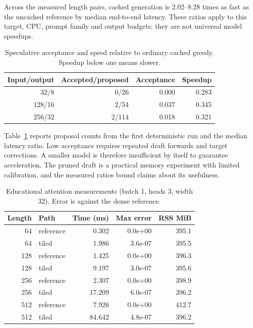 Across the measured length pairs, cached generation is 2.02--8.28 times as fast as the uncached reference by median end-to-end latency. These ratios apply to this target, CPU, prompt family and output budgets; they are not universal model speedups.

\begin{table}[t]\centering\scriptsize\caption{Speculative acceptance and speed relative to ordinary cached greedy. Speedup below one means slower.}\label{tab:spec}\begin{tabular}{rrrr}\toprule Input/output & Accepted/proposed & Acceptance & Speedup\\\midrule

32/8 & 0/26 & 0.000 & 0.283\\

128/16 & 2/54 & 0.037 & 0.345\\

256/32 & 2/114 & 0.018 & 0.321\\

\bottomrule\end{tabular}\end{table}

Table~\ref{tab:spec} reports proposal counts from the first deterministic run and the median latency ratio. Low acceptance requires repeated draft forwards and target corrections. A smaller model is therefore insufficient by itself to guarantee acceleration. The pruned draft is a practical memory experiment with limited calibration, and the measured ratios bound claims about its usefulness.

\begin{table}[t]\centering\scriptsize\caption{Educational attention measurements (batch 1, heads 3, width 32). Error is against the dense reference.}\label{tab:attention}\begin{tabular}{rlrrr}\toprule Length & Path & Time (ms) & Max error & RSS MiB\\\midrule

64 & reference & 0.302 & 0.0e+00 & 395.1\\

64 & tiled & 1.986 & 3.6e-07 & 395.5\\

128 & reference & 1.425 & 0.0e+00 & 396.3\\

128 & tiled & 9.197 & 3.0e-07 & 395.6\\

256 & reference & 2.307 & 0.0e+00 & 398.9\\

256 & tiled & 17.209 & 6.0e-07 & 396.2\\

512 & reference & 7.926 & 0.0e+00 & 412.7\\

512 & tiled & 84.642 & 4.8e-07 & 396.2\\

\bottomrule\end{tabular}\end{table}

